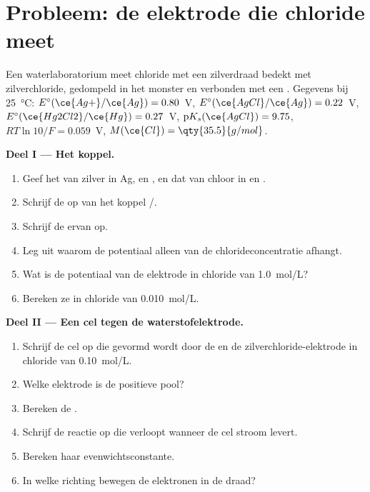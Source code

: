 \section{Probleem: de elektrode die chloride meet}

\begin{problem}
\label{pb:b1:nernst:1}
Een waterlaboratorium meet chloride met een zilverdraad bedekt met
zilverchloride, gedompeld in het monster en verbonden met een
. Gegevens bij \qty{25}{\celsius}:
$E^\circ(\ce{Ag+}/\ce{Ag}) = 0.80$~V,
$E^\circ(\ce{AgCl}/\ce{Ag}) = 0.22$~V, $E^\circ(\ce{Hg2Cl2}/\ce{Hg}) =
0.27$~V, $\mathrm{p}K_s(\ce{AgCl}) = 9.75$, $RT\ln 10/F = 0.059$~V,
$M(\ce{Cl}) = \qty{35.5}{g/mol}$.

\medskip
\noindent\textbf{Deel I --- Het koppel.}
\begin{enumerate}
  \item Geef het  van zilver in Ag,  en ,
        en dat van chloor in  en .
  \item Schrijf de  op van het koppel /.
  \item Schrijf de  ervan op.
  \item Leg uit waarom de potentiaal alleen van de chlorideconcentratie
        afhangt.
  \item Wat is de potentiaal van de elektrode in chloride van
        \qty{1.0}{mol/L}?
  \item Bereken ze in chloride van \qty{0.010}{mol/L}.
\end{enumerate}

\medskip
\noindent\textbf{Deel II --- Een cel tegen de waterstofelektrode.}
\begin{enumerate}[resume]
  \item Schrijf de cel op die gevormd wordt door de
         en de zilverchloride-elektrode in
        chloride van \qty{0.10}{mol/L}.
  \item Welke elektrode is de positieve pool?
  \item Bereken de .
  \item Schrijf de reactie op die verloopt wanneer de cel stroom levert.
  \item Bereken haar evenwichtsconstante.
  \item In welke richting bewegen de elektronen in de draad?
\end{enumerate}


\end{problem}
